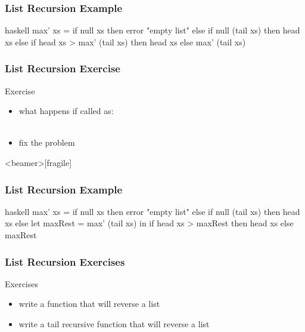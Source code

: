 \documentclass[dvipsnames]{beamer}
\theoremstyle{plain}
\begin{document}
\begin{frame}[fragile]
  \frametitle{List Recursion Example}

  \begin{example}
    \pause
    \begin{pygments}{haskell}
max' xs =
    if null xs
    then error "empty list"
    else if null (tail xs)
         then head xs
         else if head xs > max' (tail xs)
              then head xs
              else max' (tail xs)
    \end{pygments}
  \end{example}
\end{frame}

\begin{frame}[fragile]
  \frametitle{List Recursion Exercise}

  \begin{block}{Exercise}
    \begin{itemize}
      \item what happens if called as:\\
        \\
      \item fix the problem
   \end{itemize}
  \end{block}
\end{frame}

\begin{frame}<beamer>[fragile]
  \frametitle{List Recursion Example}

  \begin{example}
    \begin{pygments}{haskell}
max' xs =
    if null xs
    then error "empty list"
    else if null (tail xs)
         then head xs
         else
             let
                 maxRest = max' (tail xs)
             in
                 if head xs > maxRest
                 then head xs
                 else maxRest
    \end{pygments}
  \end{example}
\end{frame}

\begin{frame}
  \frametitle{List Recursion Exercises}

  \begin{block}{Exercises}
    \begin{itemize}
      \item write a function that will reverse a list
      \item write a tail recursive function that will reverse a list
    \end{itemize}
  \end{block}
\end{frame}
\end{document}
